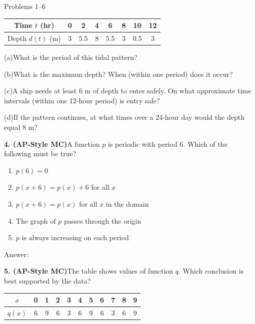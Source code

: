 \documentclass[10pt]{article}
\begin{document}
\begin{notesbox}{Problems 1--6}
\begin{center}
\renewcommand{\arraystretch}{1.35}
\begin{tabular}{|c|c|c|c|c|c|c|c|}
\hline
Time $t$ (hr) & 0 & 2 & 4 & 6 & 8 & 10 & 12 \\
\hline
Depth $d(t)$ (m) & 3 & 5.5 & 8 & 5.5 & 3 & 0.5 & 3 \\
\hline
\end{tabular}
\end{center}

\vspace{4pt}
(a)\quad What is the period of this tidal pattern? \writeline

(b)\quad What is the maximum depth? When (within one period) does it occur?
\writeline

(c)\quad A ship needs at least 6 m of depth to enter safely. On what
approximate time intervals (within one 12-hour period) is entry safe?

(d)\quad If the pattern continues, at what times over a 24-hour day would
the depth equal 8 m?

\vspace{0.12in}
\textbf{4. (AP-Style MC)}\quad A function $p$ is periodic with period 6. Which
of the following must be true?

\begin{enumerate}[label=(\Alph*), leftmargin=2em, itemsep=3pt]
  \item $p(6) = 0$
  \item $p(x + 6) = p(x) + 6$ for all $x$
  \item $p(x + 6) = p(x)$ for all $x$ in the domain
  \item The graph of $p$ passes through the origin
  \item $p$ is always increasing on each period
\end{enumerate}

Answer: \underline{\hspace{1.5cm}}

\vspace{0.12in}
\textbf{5. (AP-Style MC)}\quad The table shows values of function $q$. Which
conclusion is best supported by the data?

\begin{center}
\renewcommand{\arraystretch}{1.35}
\begin{tabular}{|c|c|c|c|c|c|c|c|c|c|c|}
\hline
$x$ & 0 & 1 & 2 & 3 & 4 & 5 & 6 & 7 & 8 & 9 \\
\hline
$q(x)$ & 6 & 9 & 6 & 3 & 6 & 9 & 6 & 3 & 6 & 9 \\
\hline
\end{tabular}
\end{center}


\end{notesbox}
\end{document}
